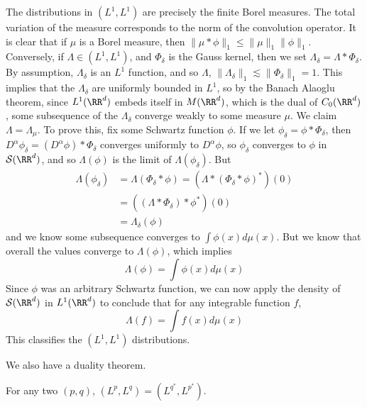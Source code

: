 \begin{example}
    The distributions in $(L^1, L^1)$ are precisely the finite Borel measures. The total variation of the measure corresponds to the norm of the convolution operator. It is clear that if $\mu$ is a Borel measure, then $\| \mu * \phi \|_1 \leq \| \mu \|_1 \| \phi \|_1$. Conversely, if $\Lambda \in (L^1, L^1)$, and $\Phi_\delta$ is the Gauss kernel, then we set $\Lambda_\delta = \Lambda * \Phi_\delta$. By assumption, $\Lambda_\delta$ is an $L^1$ function, and so $\Lambda$, $\| \Lambda_\delta \|_1 \lesssim \| \Phi_\delta \|_1 = 1$. This implies that the $\Lambda_\delta$ are uniformly bounded in $L^1$, so by the Banach Alaoglu theorem, since $L^1(\RR^d)$ embeds itself in $M(\RR^d)$, which is the dual of $C_0(\RR^d)$, some subsequence of the $\Lambda_\delta$ converge weakly to some measure $\mu$. We claim $\Lambda = \Lambda_\mu$. To prove this, fix some Schwartz function $\phi$. If we let $\phi_\delta = \phi * \Phi_\delta$, then $D^\alpha \phi_\delta = (D^\alpha \phi) * \Phi_\delta$ converges uniformly to $D^\alpha \phi$, so $\phi_\delta$ converges to $\phi$ in $\mathcal{S}(\RR^d)$, and so $\Lambda(\phi)$ is the limit of $\Lambda(\phi_\delta)$. But
    \begin{align*}
        \Lambda(\phi_\delta) &= \Lambda(\Phi_\delta * \phi) = (\Lambda * (\Phi_\delta * \phi)^*)(0)\\
        &= ((\Lambda * \Phi_\delta) * \phi^*)(0)\\
        &= \Lambda_\delta(\phi)
    \end{align*}
    and we know some subsequence converges to $\int \phi(x) d\mu(x)$. But we know that overall the values converge to $\Lambda(\phi)$, which implies
    \[ \Lambda(\phi) = \int \phi(x) d\mu(x) \]
    Since $\phi$ was an arbitrary Schwartz function, we can now apply the density of $\mathcal{S}(\RR^d)$ in $L^1(\RR^d)$ to conclude that for any integrable function $f$,
    \[ \Lambda(f) = \int f(x) d\mu(x) \]
    This classifies the $(L^1, L^1)$ distributions.
\end{example}

We also have a duality theorem.

\begin{theorem}
    For any two $(p,q)$, $(L^p,L^q) = (L^{q^*}, L^{p^*})$.
\end{theorem}












